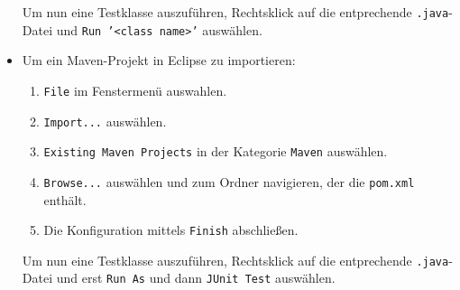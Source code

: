 \documentclass[german, solution]{acAssignment}
\begin{document}
\begin{itemize}
        Um nun eine Testklasse auszuführen, Rechtsklick auf die entprechende \texttt{.java}-Datei und \texttt{Run '<class name>'} auswählen.
    
    \item Um ein Maven-Projekt in Eclipse zu importieren:
    
        \begin{enumerate}
            \item \texttt{File} im Fenstermenü auswahlen.
            \item \texttt{Import...} auswählen.
            \item \texttt{Existing Maven Projects} in der Kategorie \texttt{Maven} auswählen.
            \item \texttt{Browse...} auswählen und zum Ordner navigieren, der die \texttt{pom.xml} enthält.
            \item Die Konfiguration mittels \texttt{Finish} abschließen.
        \end{enumerate}
        
        Um nun eine Testklasse auszuführen, Rechtsklick auf die entprechende \texttt{.java}-Datei und erst \texttt{Run As} und dann \texttt{JUnit Test} auswählen.
\end{itemize}
\end{document}
